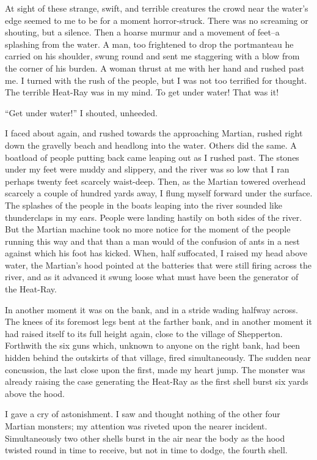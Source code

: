 At sight of these strange, swift, and terrible creatures the crowd
near the water's edge seemed to me to be for a moment
horror-struck. There was no screaming or shouting, but a silence.
Then a hoarse murmur and a movement of feet--a splashing from the
water. A man, too frightened to drop the portmanteau he carried on
his shoulder, swung round and sent me staggering with a blow from
the corner of his burden. A woman thrust at me with her hand and
rushed past me. I turned with the rush of the people, but I was not
too terrified for thought. The terrible Heat-Ray was in my mind. To
get under water! That was it!

``Get under water!'' I shouted, unheeded.

I faced about again, and rushed towards the approaching Martian,
rushed right down the gravelly beach and headlong into the water.
Others did the same. A boatload of people putting back came leaping
out as I rushed past. The stones under my feet were muddy and
slippery, and the river was so low that I ran perhaps twenty feet
scarcely waist-deep. Then, as the Martian towered overhead scarcely
a couple of hundred yards away, I flung myself forward under the
surface. The splashes of the people in the boats leaping into the
river sounded like thunderclaps in my ears. People were landing
hastily on both sides of the river. But the Martian machine took no
more notice for the moment of the people running this way and that
than a man would of the confusion of ants in a nest against which
his foot has kicked. When, half suffocated, I raised my head above
water, the Martian's hood pointed at the batteries that were still
firing across the river, and as it advanced it swung loose what
must have been the generator of the Heat-Ray.

In another moment it was on the bank, and in a stride wading
halfway across. The knees of its foremost legs bent at the farther
bank, and in another moment it had raised itself to its full height
again, close to the village of Shepperton. Forthwith the six guns
which, unknown to anyone on the right bank, had been hidden behind
the outskirts of that village, fired simultaneously. The sudden
near concussion, the last close upon the first, made my heart jump.
The monster was already raising the case generating the Heat-Ray as
the first shell burst six yards above the hood.

I gave a cry of astonishment. I saw and thought nothing of the
other four Martian monsters; my attention was riveted upon the
nearer incident. Simultaneously two other shells burst in the air
near the body as the hood twisted round in time to receive, but not
in time to dodge, the fourth shell.

